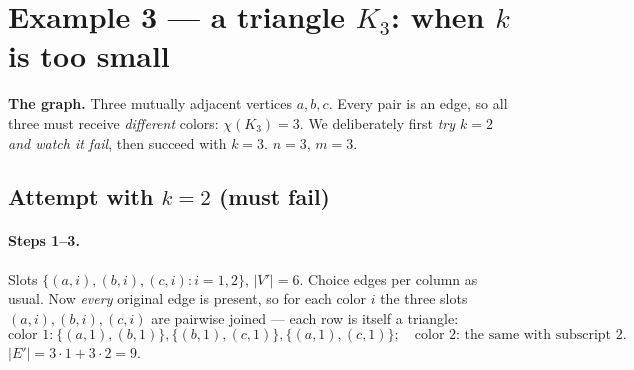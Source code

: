 \documentclass[11pt]{article}
\begin{document}
\begin{center}
\end{center}

\section{Example 3 --- a triangle \texorpdfstring{$K_3$}{K3}: when $k$ is too small}

\textbf{The graph.} Three mutually adjacent vertices $a,b,c$. Every pair is an
edge, so all three must receive \emph{different} colors: $\chi(K_3)=3$. We
deliberately first \emph{try $k=2$ and watch it fail}, then succeed with $k=3$.
$n=3$, $m=3$.

\begin{center}
\end{center}

\subsection{Attempt with $k=2$ (must fail)}

\paragraph{Steps 1--3.} Slots $\{(a,i),(b,i),(c,i):i=1,2\}$, $|V'|=6$. Choice
edges per column as usual. Now \emph{every} original edge is present, so for each
color $i$ the three slots $(a,i),(b,i),(c,i)$ are pairwise joined --- each row is
itself a triangle:
\[
\text{color 1:}\ \{(a,1),(b,1)\},\{(b,1),(c,1)\},\{(a,1),(c,1)\};\quad
\text{color 2: the same with subscript } 2.
\]
$|E'| = 3\cdot 1 + 3\cdot 2 = 9$.

\begin{center}
\end{center}
\end{document}
